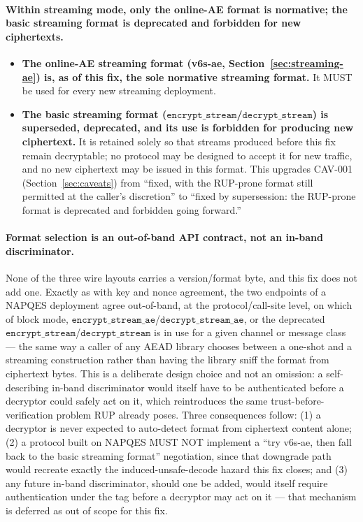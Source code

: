 \documentclass[11pt,a4paper]{article}
\begin{document}
\paragraph{Within streaming mode, only the online-AE format is normative;
the basic streaming format is deprecated and forbidden for new
ciphertexts.}
\begin{itemize}
  \item \textbf{The online-AE streaming format (v6s-ae,
        Section~\ref{sec:streaming-ae}) is, as of this fix, the sole
        normative streaming format.} It MUST be used for every new
        streaming deployment.
  \item \textbf{The basic streaming format
        ($\texttt{encrypt\_stream}$/$\texttt{decrypt\_stream}$) is
        superseded, deprecated, and its use is forbidden for producing new
        ciphertext.} It is retained solely so that streams produced before
        this fix remain decryptable; no protocol may be designed to accept
        it for new traffic, and no new ciphertext may be issued in this
        format. This upgrades CAV-001 (Section~\ref{sec:caveats}) from
        ``fixed, with the RUP-prone format still permitted at the caller's
        discretion'' to ``fixed by supersession: the RUP-prone format is
        deprecated and forbidden going forward.''
\end{itemize}

\paragraph{Format selection is an out-of-band API contract, not an in-band
discriminator.} None of the three wire layouts carries a version/format
byte, and this fix does not add one. Exactly as with key and nonce
agreement, the two endpoints of a NAPQES deployment agree out-of-band, at
the protocol/call-site level, on which of block mode,
$\texttt{encrypt\_stream\_ae}$/$\texttt{decrypt\_stream\_ae}$, or the
deprecated $\texttt{encrypt\_stream}$/$\texttt{decrypt\_stream}$ is in use
for a given channel or message class — the same way a caller of any AEAD
library chooses between a one-shot and a streaming construction rather than
having the library sniff the format from ciphertext bytes. This is a
deliberate design choice and not an omission: a self-describing in-band
discriminator would itself have to be authenticated before a decryptor
could safely act on it, which reintroduces the same
trust-before-verification problem RUP already poses. Three consequences
follow: (1) a decryptor is never expected to auto-detect format from
ciphertext content alone; (2) a protocol built on NAPQES MUST NOT implement
a ``try v6s-ae, then fall back to the basic streaming format'' negotiation,
since that downgrade path would recreate exactly the induced-unsafe-decode
hazard this fix closes; and (3) any future in-band discriminator, should
one be added, would itself require authentication under the tag before a
decryptor may act on it — that mechanism is deferred as out of scope for
this fix.
\end{document}
